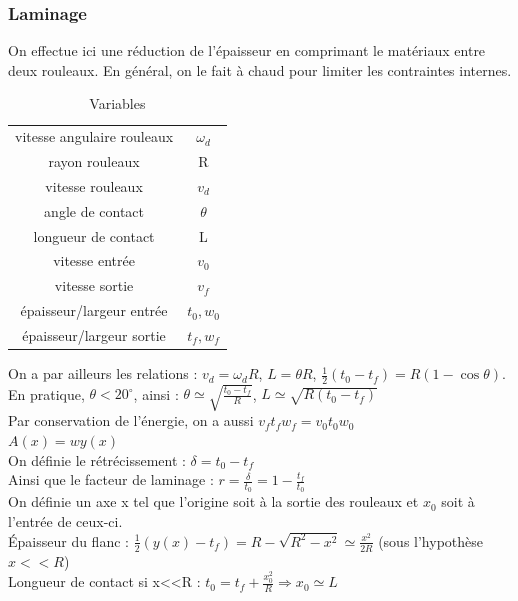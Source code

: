 \documentclass[../main.tex]{subfiles}
\begin{document}
\subsubsection{Laminage}
On effectue ici une réduction de l'épaisseur en comprimant le matériaux entre deux rouleaux. En général, on le fait à chaud pour limiter les contraintes internes.\\

\begin{table}[hbt!]
    \centering
    \begin{tabular}{c|c}
        \hline
        vitesse angulaire rouleaux & $\omega_d$ \\
        rayon rouleaux & R\\
        vitesse rouleaux & $v_d$\\
        angle de contact & $\theta$\\
        longueur de contact & L\\
        vitesse entrée & $v_0$\\
        vitesse sortie & $v_f$\\
        épaisseur/largeur entrée & $t_0,w_0$\\
        épaisseur/largeur sortie & $t_f,w_f$\\
    \end{tabular}
    \caption{Variables}
\end{table}

On a par ailleurs les relations : $v_d = \omega_d R$, $L=\theta R$, $\frac{1}{2}(t_0-t_f) = R(1-\cos{\theta})$.\\
En pratique, $\theta<20^\circ$, ainsi : $\theta \simeq \sqrt{\frac{t_0-t_f}{R}}$, $L \simeq \sqrt{R(t_0-t_f)}$\\
Par conservation de l'énergie, on a aussi $v_ft_fw_f = v_0t_0w_0$\\
$A(x) = w y(x)$\\

On définie le rétrécissement : $\delta = t_0-t_f$\\
Ainsi que le facteur de laminage : $r = \frac{\delta}{t_0} = 1- \frac{t_f}{t_0}$\\

On définie un axe x tel que l'origine soit à la sortie des rouleaux et $x_0$ soit à l'entrée de ceux-ci.\\

Épaisseur du flanc : $\frac{1}{2}(y(x)-t_f) = R-\sqrt{R^2-x^2} \simeq \frac{x^2}{2R}$ (sous l'hypothèse $x<<R$)\\
Longueur de contact si x<<R : $t_0=t_f + \frac{x_0^2}{R} \Rightarrow x_0 \simeq L$\\
\end{document}
